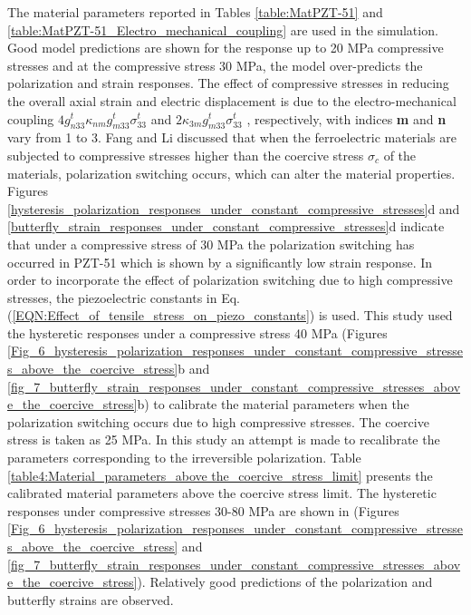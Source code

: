 The material parameters reported in Tables \ref{table:MatPZT-51} and \ref{table:MatPZT-51_Electro_mechanical_coupling} are used in the simulation. 
Good model predictions are shown for the response up to 20 MPa compressive stresses and at the compressive stress 30 MPa,
 the model over-predicts the polarization and strain responses. 
 The effect of compressive stresses in reducing the overall axial strain and
 electric displacement is due to the electro-mechanical coupling $4g_{n33}^t{\kappa _{nm}}g_{m33}^t\sigma _{33}^t$ and $2{\kappa _{3m}}g_{m33}^t\sigma _{33}^t$ , respectively, with indices \textbf{m} and \textbf{n} vary from 1 to 3. Fang and Li \cite{Li2004959} discussed that when the ferroelectric materials are subjected to compressive stresses higher than the coercive stress $\sigma _c$ of the materials, polarization switching occurs, which can alter the material properties.
 Figures \ref{hysteresis_polarization_responses_under_constant_compressive_stresses}d and \ref{butterfly_strain_responses_under_constant_compressive_stresses}d indicate that under a compressive stress of 30 MPa the polarization switching has occurred in PZT-51 which is shown by a significantly low strain response.
In order to incorporate the effect of polarization switching due to high compressive stresses, the piezoelectric constants in Eq. (\ref{EQN:Effect_of_tensile_stress_on_piezo_constants}) is used. 
This study used the hysteretic responses under a compressive stress 40 MPa (Figures \ref{Fig_6_hysteresis_polarization_responses_under_constant_compressive_stresses_above_the_coercive_stress}b and \ref{fig_7_butterfly_strain_responses_under_constant_compressive_stresses_above_the_coercive_stress}b) to calibrate the material parameters when the polarization switching occurs due to high compressive stresses.  
The coercive stress is taken as 25 MPa. 
In this study an attempt is made to recalibrate the parameters corresponding to the irreversible polarization. 
Table \ref{table4:Material_parameters_above the_coercive_stress_limit} presents the calibrated material parameters above the coercive stress limit. 
The hysteretic responses under compressive stresses 30-80 MPa are shown in (Figures \ref{Fig_6_hysteresis_polarization_responses_under_constant_compressive_stresses_above_the_coercive_stress} and \ref{fig_7_butterfly_strain_responses_under_constant_compressive_stresses_above_the_coercive_stress}). 
Relatively good predictions of the polarization and butterfly strains are observed.


